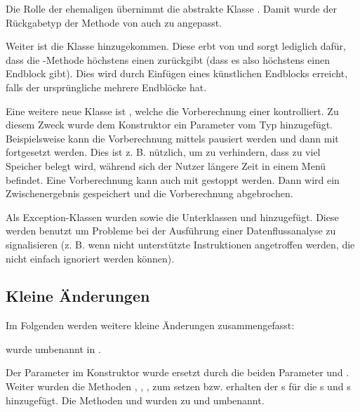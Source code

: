 Die Rolle der ehemaligen  übernimmt die abstrakte Klasse .
Damit wurde der Rückgabetyp der Methode  von  auch zu  angepasst.

Weiter ist die Klasse  hinzugekommen.
Diese erbt von  und sorgt lediglich dafür, dass die -Methode höchstens einen  zurückgibt (dass es also höchstens einen Endblock gibt). Dies wird durch Einfügen eines künstlichen Endblocks erreicht, falls der ursprüngliche  mehrere Endblöcke hat.

Eine weitere neue Klasse ist , welche die Vorberechnung einer  kontrolliert. Zu diesem Zweck wurde dem Konstruktor ein Parameter vom Typ  hinzugefügt.
Beispielsweise kann die Vorberechnung mittels  pausiert werden und dann mit  fortgesetzt werden. 
Dies ist z. B. nützlich, um zu verhindern, dass zu viel Speicher belegt wird, während sich der Nutzer längere Zeit in einem Menü befindet. 
Eine Vorberechnung kann auch mit  gestoppt werden.
Dann wird ein Zwischenergebnis gespeichert und die Vorberechnung abgebrochen.

Als Exception-Klassen wurden  sowie die Unterklassen  und  hinzugefügt.
Diese werden benutzt um Probleme bei der Ausführung einer Datenflussanalyse zu signalisieren (z. B. wenn nicht unterstützte Instruktionen angetroffen werden, die nicht einfach ignoriert werden können).

\subsection{Kleine Änderungen}

Im Folgenden werden weitere kleine Änderungen zusammengefasst:

 wurde umbenannt in .

Der Parameter  im Konstruktor  wurde ersetzt durch die beiden Parameter  und .
Weiter wurden die  Methoden , , ,  zum setzen bzw. erhalten der s für die s und s hinzugefügt.
Die Methoden  und  wurden zu  und  umbenannt.


